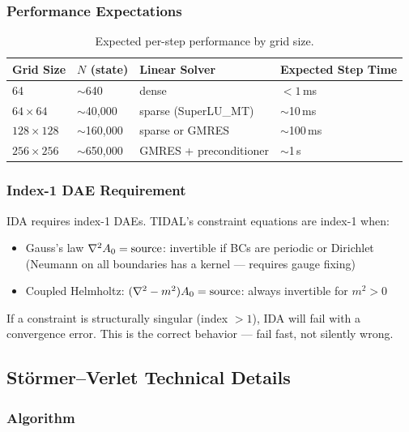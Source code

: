 \subsubsection{Performance Expectations}
\label{sec:performance-expectations}

\begin{table}[htbp]
\centering
\caption{Expected per-step performance by grid size.}
\label{tab:performance}
\begin{tabular}{@{}llll@{}}
\toprule
Grid Size & $N$ (state) & Linear Solver & Expected Step Time \\
\midrule
64 & $\sim$640 & dense & $< 1$\,ms \\
$64\times 64$ & $\sim$40{,}000 & sparse (SuperLU\_MT) & $\sim$10\,ms \\
$128\times 128$ & $\sim$160{,}000 & sparse or GMRES & $\sim$100\,ms \\
$256\times 256$ & $\sim$650{,}000 & GMRES + preconditioner & $\sim$1\,s \\
\bottomrule
\end{tabular}
\end{table}

\subsubsection{Index-1 DAE Requirement}
\label{sec:index1}

IDA requires index-1 DAEs. TIDAL's constraint equations are index-1 when:

\begin{itemize}
  \item Gauss's law $\nabla^2 A_0 = \mathrm{source}$: invertible if BCs are periodic or Dirichlet
    (Neumann on all boundaries has a kernel --- requires gauge fixing)
  \item Coupled Helmholtz: $(\nabla^2 - m^2)A_0 = \mathrm{source}$: always invertible for $m^2 > 0$
\end{itemize}

If a constraint is structurally singular (index $> 1$), IDA will fail with a
convergence error. This is the correct behavior --- fail fast, not silently wrong.

\subsection{St\"ormer--Verlet Technical Details}
\label{sec:verlet-details}

\subsubsection{Algorithm}
\label{sec:verlet-algorithm}

